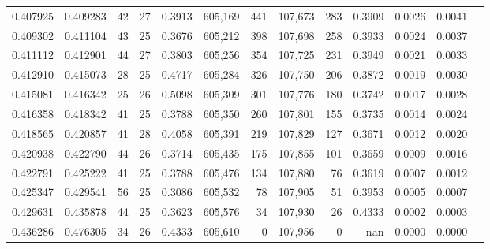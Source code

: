 \begin{tabular}{rrrrrrrrrrrrr}
0.407925 & 0.409283 &  42 &  27 &                                     0.3913 & 605,169 &     441 & 107,673 &     283 & 0.3909 & 0.0026 & 0.0041 \\
0.409302 & 0.411104 &  43 &  25 &                                     0.3676 & 605,212 &     398 & 107,698 &     258 & 0.3933 & 0.0024 & 0.0037 \\
0.411112 & 0.412901 &  44 &  27 &                                     0.3803 & 605,256 &     354 & 107,725 &     231 & 0.3949 & 0.0021 & 0.0033 \\
0.412910 & 0.415073 &  28 &  25 &                                     0.4717 & 605,284 &     326 & 107,750 &     206 & 0.3872 & 0.0019 & 0.0030 \\
0.415081 & 0.416342 &  25 &  26 &                                     0.5098 & 605,309 &     301 & 107,776 &     180 & 0.3742 & 0.0017 & 0.0028 \\
0.416358 & 0.418342 &  41 &  25 &                                     0.3788 & 605,350 &     260 & 107,801 &     155 & 0.3735 & 0.0014 & 0.0024 \\
0.418565 & 0.420857 &  41 &  28 &                                     0.4058 & 605,391 &     219 & 107,829 &     127 & 0.3671 & 0.0012 & 0.0020 \\
0.420938 & 0.422790 &  44 &  26 &                                     0.3714 & 605,435 &     175 & 107,855 &     101 & 0.3659 & 0.0009 & 0.0016 \\
0.422791 & 0.425222 &  41 &  25 &                                     0.3788 & 605,476 &     134 & 107,880 &      76 & 0.3619 & 0.0007 & 0.0012 \\
0.425347 & 0.429541 &  56 &  25 &                                     0.3086 & 605,532 &      78 & 107,905 &      51 & 0.3953 & 0.0005 & 0.0007 \\
0.429631 & 0.435878 &  44 &  25 &                                     0.3623 & 605,576 &      34 & 107,930 &      26 & 0.4333 & 0.0002 & 0.0003 \\
0.436286 & 0.476305 &  34 &  26 &                                     0.4333 & 605,610 &       0 & 107,956 &       0 &    nan & 0.0000 & 0.0000 \\
\bottomrule
\end{tabular}
